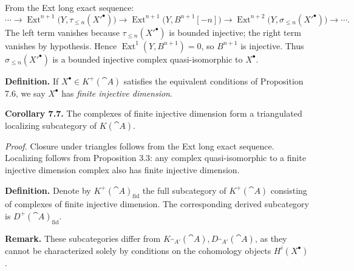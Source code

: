 \setcounter{page}{83}
From the Ext long exact sequence:
\[
\cdots\to\operatorname{Ext}^{n+1}\big(Y,\tau_{\le n}(X'^\bullet)\big)
\to\operatorname{Ext}^{n+1}\big(Y,B^{n+1}[-n]\big)
\to\operatorname{Ext}^{n+2}\big(Y,\sigma_{\le n}(X'^\bullet)\big)\to\cdots.
\]
The left term vanishes because \(\tau_{\le n}(X'^\bullet)\) is bounded injective; the right term vanishes by hypothesis. Hence \(\operatorname{Ext}^1(Y,B^{n+1})=0\), so \(B^{n+1}\) is injective.
Thus \(\sigma_{\le n}(X'^\bullet)\) is a bounded injective complex quasi-isomorphic to \(X^\bullet\).

\textbf{Definition.}
If \(X^\bullet\in K^+(\cat{A})\) satisfies the equivalent conditions of Proposition 7.6, we say \(X^\bullet\) has \textit{finite injective dimension}.

\setcounter{page}{84}
\textbf{Corollary 7.7.}
The complexes of finite injective dimension form a triangulated localizing subcategory of \(K(\cat{A})\).

\textit{Proof.}
Closure under triangles follows from the Ext long exact sequence. Localizing follows from Proposition 3.3: any complex quasi-isomorphic to a finite injective dimension complex also has finite injective dimension.

\textbf{Definition.}
Denote by \(K^+(\cat{A})_{\mathrm{fid}}\) the full subcategory of \(K^+(\cat{A})\) consisting of complexes of finite injective dimension. The corresponding derived subcategory is \(D^+(\cat{A})_{\mathrm{fid}}\).

\textbf{Remark.}
These subcategories differ from \(K_{\cat{A}'}(\cat{A}),D_{\cat{A}'}(\cat{A})\), as they cannot be characterized solely by conditions on the cohomology objects \(H^i(X^\bullet)\).